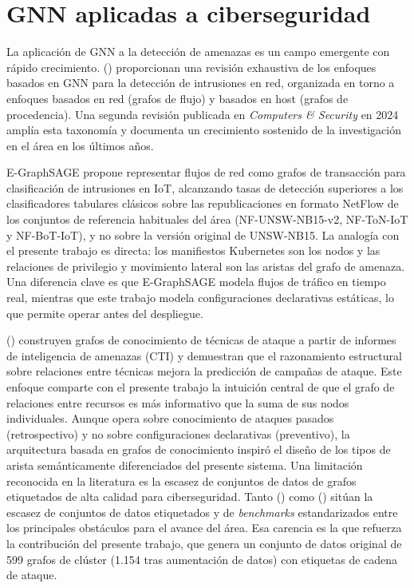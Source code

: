 \section{\acs{GNN} aplicadas a ciberseguridad}

La aplicación de \acs{GNN} a la detección de amenazas es un campo emergente con rápido
crecimiento. \citeauthor{Bilot2023} (\citeyear{Bilot2023}) proporcionan una
revisión exhaustiva de los enfoques basados en \ac{GNN} para la detección de
intrusiones en red, organizada en torno a enfoques basados en red (grafos de flujo) y
basados en host (grafos de procedencia). Una segunda revisión publicada
en \textit{Computers \& Security} en 2024 \citep{GNNSurvey2024} amplía esta
taxonomía y documenta un crecimiento sostenido de la investigación en el área en
los últimos años.

E-GraphSAGE \citep{Lo2022} propone representar flujos de red como grafos de
transacción para clasificación de intrusiones en \ac{IoT}, alcanzando tasas de detección
superiores a los clasificadores tabulares clásicos sobre las republicaciones en
formato NetFlow de los conjuntos de referencia habituales del área
(NF-UNSW-NB15-v2, NF-ToN-IoT y NF-BoT-IoT), y no sobre la versión original de
UNSW-NB15.
La
analogía con el presente trabajo es directa: los manifiestos Kubernetes
son los nodos y las relaciones de privilegio y movimiento lateral son las aristas del
grafo de amenaza. Una diferencia clave es que E-GraphSAGE modela flujos de
tráfico en tiempo real, mientras que este trabajo modela configuraciones declarativas
estáticas, lo que permite operar antes del despliegue.

\citeauthor{Li2022} (\citeyear{Li2022}) construyen grafos de conocimiento de técnicas
de ataque a partir de informes de inteligencia de amenazas (\acs{CTI}) y demuestran que el
razonamiento estructural sobre relaciones entre técnicas mejora la predicción de
campañas de ataque. Este enfoque comparte con el presente trabajo la intuición central
de que el grafo de relaciones entre recursos es más informativo que la suma de sus
nodos individuales. Aunque opera sobre conocimiento de ataques pasados (retrospectivo)
y no sobre configuraciones declarativas (preventivo), la arquitectura basada en grafos
de conocimiento inspiró el diseño de los tipos de arista semánticamente diferenciados
del presente sistema.
Una limitación reconocida en la literatura es la escasez de conjuntos de datos de
grafos etiquetados de alta calidad para ciberseguridad. Tanto \citeauthor{Bilot2023}
(\citeyear{Bilot2023}) como \citeauthor{GNNSurvey2024} (\citeyear{GNNSurvey2024})
sitúan la escasez de conjuntos de datos etiquetados y de \textit{benchmarks}
estandarizados entre los principales obstáculos para el avance del área. Esa
carencia es la que refuerza la contribución del presente trabajo, que genera un
conjunto de datos original de 599 grafos de clúster (1.154 tras aumentación de
datos) con etiquetas de cadena de ataque.

